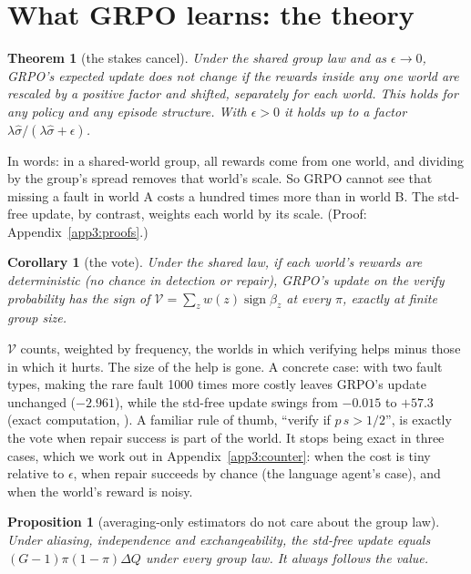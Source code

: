 \documentclass[11pt]{article}
\newtheorem{theorem}{Theorem}
\newtheorem{proposition}{Proposition}
\newtheorem{corollary}{Corollary}
\newcommand{\sgn}{\operatorname{sign}}
\begin{document}
\section{What GRPO learns: the theory}\label{sec:theory}
\begin{theorem}[the stakes cancel]\label{thm:inv}
Under the shared group law and as $\epsilon\to0$, GRPO's expected update does not change if the rewards inside any one
world are rescaled by a positive factor and shifted, separately for each world. This holds for any policy and any
episode structure. With $\epsilon>0$ it holds up to a factor $\lambda\hat\sigma/(\lambda\hat\sigma+\epsilon)$.
\end{theorem}
\noindent In words: in a shared-world group, all rewards come from one world, and dividing by the group's spread
removes that world's scale. So GRPO cannot see that missing a fault in world A costs a hundred times more than in
world B. The std-free update, by contrast, weights each world by its scale. (Proof: Appendix~\ref{app3:proofs}.)

\begin{corollary}[the vote]\label{cor:vote}
Under the shared law, if each world's rewards are deterministic (no chance in detection or repair), GRPO's update on
the verify probability has the sign of $\mathcal V=\sum_z w(z)\sgn\beta_z$ at every $\pi$, exactly at finite group size.
\end{corollary}
\noindent $\mathcal V$ counts, weighted by frequency, the worlds in which verifying helps minus those in which it
hurts. The size of the help is gone. A concrete case: with two fault types, making the rare fault 1000 times more
costly leaves GRPO's update unchanged ($-2.961$), while the std-free update swings from $-0.015$ to $+57.3$ (exact
computation, ). A familiar rule of thumb, ``verify if $p\,s>1/2$'', is exactly the vote
when repair success is part of the world. It stops being exact in three cases, which we work out in
Appendix~\ref{app3:counter}: when the cost is tiny relative to $\epsilon$, when repair succeeds by chance (the language
agent's case), and when the world's reward is noisy.

\begin{proposition}[averaging-only estimators do not care about the group law]\label{prop:bern}
Under aliasing, independence and exchangeability, the std-free update equals $(G-1)\pi(1-\pi)\Delta Q$ under every
group law. It always follows the value.
\end{proposition}
\end{document}
